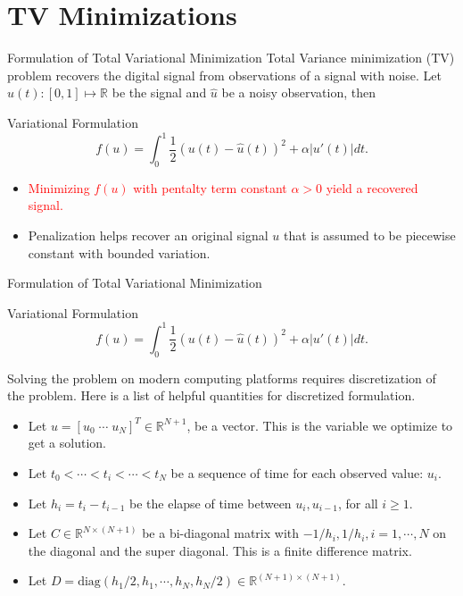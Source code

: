 \documentclass[11pt]{beamer}
\theoremstyle{definition}
\begin{document}
\section{TV Minimizations}
    \begin{frame}{Formulation of Total Variational Minimization}
        Total Variance minimization (TV) problem recovers the digital signal from observations of a signal with noise. 
        Let $u(t):[0, 1]\mapsto \mathbb R$ be the signal and $\hat u$ be a noisy observation, then
        \begin{block}{Variational Formulation}
            \[
                f(u) = \int_0^1 \frac{1}{2} 
                (u(t) - \hat u(t))^2 + \alpha |u'(t)|dt. 
            \]    
        \end{block}
        \begin{itemize}
            \item \textcolor{red}{Minimizing $f(u)$ with pentalty term constant $\alpha > 0$ yield a recovered signal. }
            \item Penalization helps recover an original signal $u$ that is assumed to be piecewise constant with bounded variation. 
        \end{itemize}
    \end{frame}
    \begin{frame}{Formulation of Total Variational Minimization}
        \begin{block}{Variational Formulation}
            \[
                f(u) = \int_0^1 \frac{1}{2} 
                (u(t) - \hat u(t))^2 + \alpha |u'(t)|dt. 
            \]    
        \end{block}
        Solving the problem on modern computing platforms requires discretization of the problem. 
        Here is a list of helpful quantities for discretized formulation. 
        \begin{itemize}
            \item Let $u = [u_0\; \cdots \; u_{N}]^T \in \mathbb R^{N + 1}$, be a vector. 
            This is the variable we optimize to get a solution. 
            \item Let $t_0< \cdots<  t_i <\cdots <t_N$ be a sequence of time for each observed value: $u_i$. 
            \item Let $h_i=t_{i} - t_{i - 1}$ be the elapse of time between $u_i, u_{i - 1}$, for all $i \ge 1$. 
            \item Let $C\in \mathbb R^{N\times (N + 1)}$ be a bi-diagonal matrix with $-1/h_{i}, 1/h_{i}, i = 1,\cdots, N$ on the diagonal and the super diagonal. 
            This is a finite difference matrix. 
            \item Let $D= \text{diag}(h_1/2, h_1,\cdots, h_N, h_{N}/2) \in \mathbb R^{(N + 1)\times(N + 1)}$. 
        \end{itemize}
    \end{frame}
\end{document}
